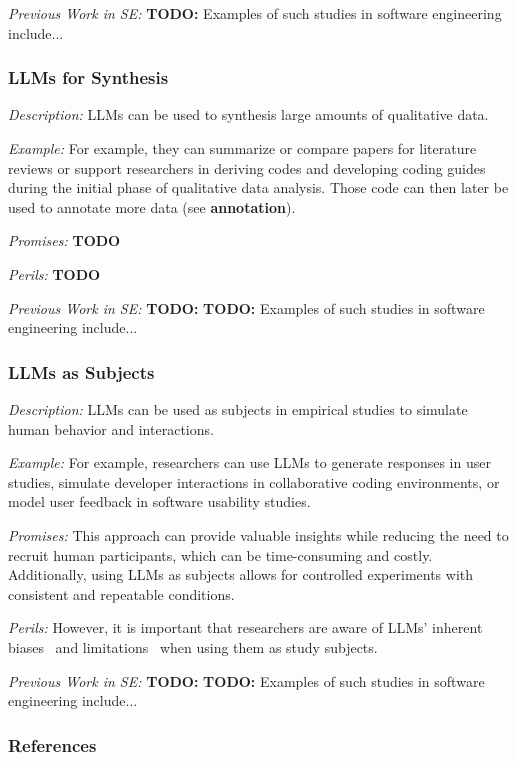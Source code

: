 \documentclass[11pt]{article}
\begin{document}
\emph{Previous Work in SE:}  \textbf{TODO:} Examples of such studies in software engineering include...


\subsubsection{LLMs for Synthesis}

\emph{Description:} LLMs can be used to synthesis large amounts of qualitative data.

\emph{Example:}  For example, they can summarize or compare papers for literature reviews or support researchers in deriving codes and developing coding guides during the initial phase of qualitative data analysis. Those code can then later be used to annotate more data (see \textbf{annotation}).

\emph{Promises:} \textbf{TODO}

\emph{Perils:} \textbf{TODO}

\emph{Previous Work in SE:}  \textbf{TODO:}  \textbf{TODO:} Examples of such studies in software engineering include...


\subsubsection{LLMs as Subjects}

\emph{Description:} LLMs can be used as subjects in empirical studies to simulate human behavior and interactions.

\emph{Example:} For example, researchers can use LLMs to generate responses in user studies, simulate developer interactions in collaborative coding environments, or model user feedback in software usability studies.

\emph{Promises:}  This approach can provide valuable insights while reducing the need to recruit human participants, which can be time-consuming and costly. Additionally, using LLMs as subjects allows for controlled experiments with consistent and repeatable conditions.

\emph{Perils:} However, it is important that researchers are aware of LLMs' inherent biases~\cite{Crowell2023} and limitations~\cite{DBLP:journals/ais/HardingDLL24} when using them as study subjects.

\emph{Previous Work in SE:}  \textbf{TODO:}  \textbf{TODO:} Examples of such studies in software engineering include...

\subsubsection{References}



\end{document}
